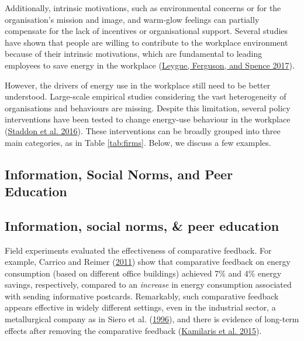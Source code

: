 \documentclass[
  11pt,
]{article}
\begin{document}
Additionally, intrinsic motivations, such as environmental concerns or
for the organisation's mission and image, and warm-glow feelings can
partially compensate for the lack of incentives or organisational
support. Several studies have shown that people are willing to
contribute to the workplace environment because of their intrinsic
motivations, which are fundamental to leading employees to save energy
in the workplace (\protect\hyperlink{ref-leygue2017saving}{Leygue,
Ferguson, and Spence 2017}).

However, the drivers of energy use in the workplace still need to be
better understood. Large-scale empirical studies considering the vast
heterogeneity of organisations and behaviours are missing. Despite this
limitation, several policy interventions have been tested to change
energy-use behaviour in the workplace
(\protect\hyperlink{ref-staddon2016intervening}{Staddon et al. 2016}).
These interventions can be broadly grouped into three main categories,
as in Table \ref{tab:firms}. Below, we discuss a few examples.

\hypertarget{information-social-norms-and-peer-education}{%
\subsection{Information, Social Norms, and Peer
Education}\label{information-social-norms-and-peer-education}}

\hypertarget{information-social-norms-peer-education}{%
\subsection{Information, social norms, \& peer
education}\label{information-social-norms-peer-education}}

Field experiments evaluated the effectiveness of comparative feedback.
For example, Carrico and Reimer
(\protect\hyperlink{ref-carrico2011motivating}{2011}) show that
comparative feedback on energy consumption (based on different office
buildings) achieved 7\% and 4\% energy savings, respectively, compared
to an \emph{increase} in energy consumption associated with sending
informative postcards. Remarkably, such comparative feedback appears
effective in widely different settings, even in the industrial sector, a
metallurgical company as in Siero et al.
(\protect\hyperlink{ref-siero1996changing}{1996}), and there is evidence
of long-term effects after removing the comparative feedback
(\protect\hyperlink{ref-kamilaris2015case}{Kamilaris et al. 2015}).
\end{document}

